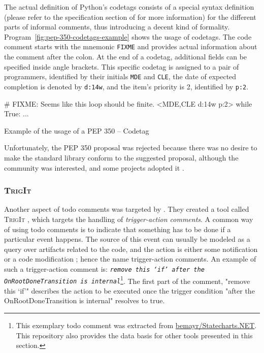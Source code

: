 The actual definition of Python's codetags consists of a special syntax definition (please refer to the specification section of \cite{elliott_pep_2005} for more information) for the different parts of informal comments, thus introducing a decent kind of formality.
Program~\ref{fig:pep-350-codetags-example} shows the usage of codetags.
The code comment starts with the mnemonic \texttt{FIXME} and provides actual information about the comment after the colon.
At the end of a codetag, additional fields can be specified inside angle brackets.
This specific codetag is assigned to a pair of programmers, identified by their initials \texttt{MDE} and \texttt{CLE}, the date of expected completion is denoted by \texttt{d:14w}, and the item's priority is 2, identified by \texttt{p:2}. 
%
\begin{program}[ht]
\begin{PythonCode}
# FIXME: Seems like this loop should be finite. <MDE,CLE d:14w p:2>
while True: ...
\end{PythonCode}
\caption{Example of the usage of a PEP 350 -- Codetag}
\label{fig:pep-350-codetags-example}
\end{program}
%
Unfortunately, the PEP 350 proposal was rejected because there was no desire to make the standard library conform to the suggested proposal, although the community was interested, and some projects adopted it \cite{elliott_pep_2005}.


\subsubsection{\textsc{TrigIt}}
\label{sec:trigit}
Another aspect of todo comments was targeted by \citeauthor{nie_framework_2019} \cite{nie_framework_2019}.
They created a tool called \textsc{TrigIt} \cite{nie_framework_2019}, which targets the handling of \emph{trigger-action comments}.
A common way of using todo comments is to indicate that something has to be done if a particular event happens.
The source of this event can usually be modeled as a query over artifacts related to the code, and the action is either some notification or a code modification \cite{nie_framework_2019}; hence the name trigger-action comments.
An example of such a trigger-action comment is: \emph{\texttt{remove this `if' after the OnRootDoneTransition is internal}}\footnote{This exemplary todo comment was extracted from \href{https://github.com/bemayr/Statecharts.NET}{bemayr/Statecharts.NET}. This repository also provides the data basis for other tools presented in this section.}.
The first part of the comment, "remove this `if'" describes the action to be executed once the trigger condition "after the OnRootDoneTransition is internal" resolves to true.

